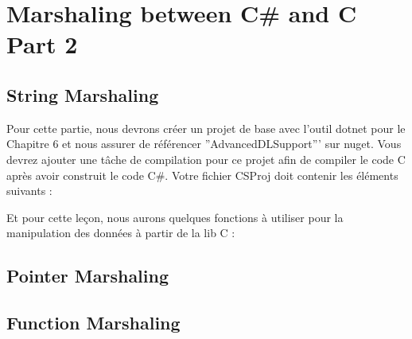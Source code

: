 \chapter{Marshaling between C\# and C Part 2}
\section{String Marshaling}
Pour cette partie, nous devrons créer un projet de base avec l'outil dotnet pour le Chapitre 6 et nous assurer de référencer ''AdvancedDLSupport''' sur nuget. Vous devrez ajouter une tâche de compilation pour ce projet afin de compiler le code C après avoir construit le code C\#. Votre fichier CSProj doit contenir les éléments suivants :

Et pour cette leçon, nous aurons quelques fonctions à utiliser pour la manipulation des données à partir de la lib C :



\section{Pointer Marshaling}

\section{Function Marshaling}